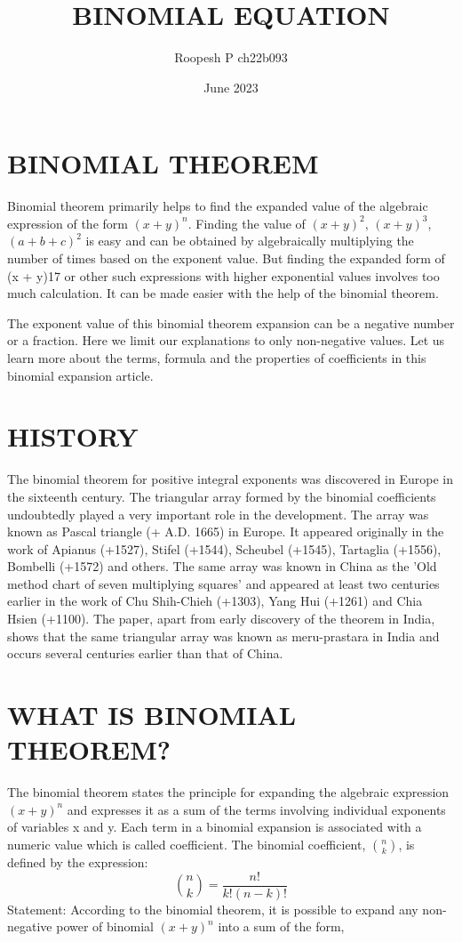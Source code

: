 \documentclass{article}
\title{BINOMIAL EQUATION}
\author{Roopesh P ch22b093}
\date{June 2023}
\begin{document}
\maketitle

\section{BINOMIAL THEOREM}
Binomial theorem primarily helps to find the expanded value of the algebraic expression of the form $(x + y)^n$. Finding the value of $(x + y)^2$, $(x + y)^3$, $(a + b + c)^2$ is easy and can be obtained by algebraically multiplying the number of times based on the exponent value. But finding the expanded form of (x + y)17 or other such expressions with higher exponential values involves too much calculation. It can be made easier with the help of the binomial theorem.

The exponent value of this binomial theorem expansion can be a negative number or a fraction. Here we limit our explanations to only non-negative values. Let us learn more about the terms, formula and the properties of coefficients in this binomial expansion article.
\section{HISTORY}
The binomial theorem for positive integral exponents was discovered in Europe in the sixteenth century. The triangular array formed by the binomial coefficients undoubtedly played a very important role in the development. The array was known as Pascal triangle (+ A.D. 1665) in Europe. It appeared originally in the work of Apianus (+1527), Stifel (+1544), Scheubel (+1545), Tartaglia (+1556), Bombelli (+1572) and others. The same array was known in China as the 'Old method chart of seven multiplying squares' and appeared at least two centuries earlier in the work of Chu Shih-Chieh (+1303), Yang Hui (+1261) and Chia Hsien (+1100). The paper, apart from early discovery of the theorem in India, shows that the same triangular array was known as meru-prastara in India and occurs several centuries earlier than that of China.\cite{bag1966binomial}
\section{WHAT IS BINOMIAL THEOREM?}
The binomial theorem states the principle for expanding the algebraic expression $(x + y)^n$ and expresses it as a sum of the terms involving individual exponents of variables x and y. Each term in a binomial expansion is associated with a numeric value which is called coefficient.
The binomial coefficient, \(\binom{n}{k}\), is defined by the expression:
\[
    \binom{n}{k} = \frac{n!}{k!(n-k)!}
\]
Statement: According to the binomial theorem, it is possible to expand any non-negative power of binomial $(x + y)^n$ into a sum of the form,
\end{document}
